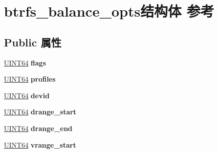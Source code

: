\hypertarget{structbtrfs__balance__opts}{}\section{btrfs\+\_\+balance\+\_\+opts结构体 参考}
\label{structbtrfs__balance__opts}
\subsection*{Public 属性}
\begin{DoxyCompactItemize}
\item 
\mbox{\label{structbtrfs__balance__opts_a5353a2372d9e1c627351f01a98ae52e9}} 
\hyperlink{_processor_bind_8h_a57be03562867144161c1bfee95ca8f7c}{U\+I\+N\+T64} {\bfseries flags}
\item 
\mbox{\label{structbtrfs__balance__opts_a60c0fd179e9d3ef28c1fcac002737a51}} 
\hyperlink{_processor_bind_8h_a57be03562867144161c1bfee95ca8f7c}{U\+I\+N\+T64} {\bfseries profiles}
\item 
\mbox{\label{structbtrfs__balance__opts_a3282fe5771fd827a4193cb96af8838e0}} 
\hyperlink{_processor_bind_8h_a57be03562867144161c1bfee95ca8f7c}{U\+I\+N\+T64} {\bfseries devid}
\item 
\mbox{\label{structbtrfs__balance__opts_a9e7d010d402f0dcfc6532da629089ebd}} 
\hyperlink{_processor_bind_8h_a57be03562867144161c1bfee95ca8f7c}{U\+I\+N\+T64} {\bfseries drange\+\_\+start}
\item 
\mbox{\label{structbtrfs__balance__opts_ac50b5d52e9d39f74a43f7872b2c823bd}} 
\hyperlink{_processor_bind_8h_a57be03562867144161c1bfee95ca8f7c}{U\+I\+N\+T64} {\bfseries drange\+\_\+end}
\item 
\mbox{\label{structbtrfs__balance__opts_a704c17e786d0e6cc4411161a02f14f1f}} 
\hyperlink{_processor_bind_8h_a57be03562867144161c1bfee95ca8f7c}{U\+I\+N\+T64} {\bfseries vrange\+\_\+start}
\item 
\mbox{\label{structbtrfs__balance__opts_a1220c4fe33c3ff133524875241e8880c}} 

\end{DoxyCompactItemize}
